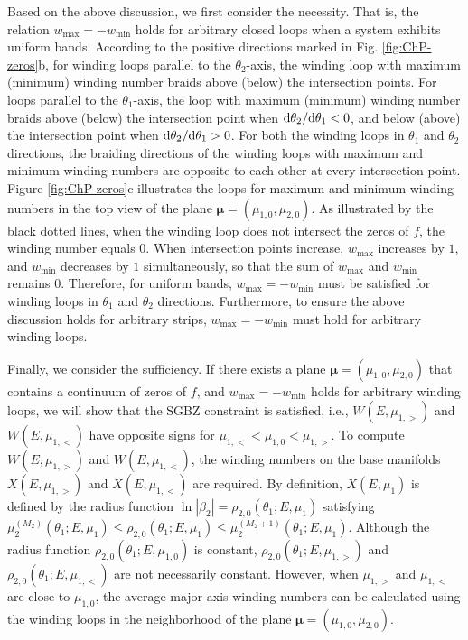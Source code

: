 Based on the above discussion, we first consider the necessity. That
is, the relation $w_{\text{max}}=-w_{\text{min}}$ holds for arbitrary
closed loops when a system exhibits uniform bands. According to the
positive directions marked in Fig. \ref{fig:ChP-zeros}b, for winding
loops parallel to the $\theta_{2}$-axis, the winding loop with maximum
(minimum) winding number braids above (below) the intersection points.
For loops parallel to the $\theta_{1}$-axis, the loop with maximum
(minimum) winding number braids above (below) the intersection point
when $\mathrm{d}\theta_{2}/\mathrm{d}\theta_{1}<0$, and below (above) the intersection
point when $\mathrm{d}\theta_{2}/\mathrm{d}\theta_{1}>0$. For both the winding
loops in $\theta_{1}$ and $\theta_{2}$ directions, the braiding
directions of the winding loops with maximum and minimum winding numbers
are opposite to each other at every intersection point. Figure \ref{fig:ChP-zeros}c
illustrates the loops for maximum and minimum winding numbers in the
top view of the plane $\boldsymbol{\mu}=(\mu_{1,0},\mu_{2,0})$. As
illustrated by the black dotted lines, when the winding loop does
not intersect the zeros of $f$, the winding number equals $0$. When
intersection points increase, $w_{\text{max}}$ increases by $1$,
and $w_{\text{min}}$ decreases by $1$ simultaneously, so that the
sum of $w_{\text{max}}$ and $w_{\text{min}}$ remains $0$. Therefore,
for uniform bands, $w_{\text{max}}=-w_{\text{min}}$ must be satisfied
for winding loops in $\theta_{1}$ and $\theta_{2}$ directions. Furthermore,
to ensure the above discussion holds for arbitrary strips, $w_{\text{max}}=-w_{\text{min}}$
must hold for arbitrary winding loops.

Finally, we consider the sufficiency. If there exists a plane $\boldsymbol{\mu}=(\mu_{1,0},\mu_{2,0})$
that contains a continuum of zeros of $f$, and $w_{\text{max}}=-w_{\text{min}}$
holds for arbitrary winding loops, we will show that the SGBZ constraint
is satisfied, i.e., $W(E,\mu_{1,>})$ and $W(E,\mu_{1,<})$ have opposite
signs for $\mu_{1,<}<\mu_{1,0}<\mu_{1,>}$. To compute $W(E,\mu_{1,>})$
and $W(E,\mu_{1,<})$, the winding numbers on the base manifolds $X(E,\mu_{1,>})$
and $X(E,\mu_{1,<})$ are required. By definition, $X(E,\mu_{1})$
is defined by the radius function $\ln|\beta_{2}|=\rho_{2,0}(\theta_{1};E,\mu_{1})$
satisfying $\mu_{2}^{(M_{2})}(\theta_{1};E,\mu_{1})\leq\rho_{2,0}(\theta_{1};E,\mu_{1})\leq\mu_{2}^{(M_{2}+1)}(\theta_{1};E,\mu_{1})$.
Although the radius function $\rho_{2,0}(\theta_{1};E,\mu_{1,0})$
is constant, $\rho_{2,0}(\theta_{1};E,\mu_{1,>})$ and $\rho_{2,0}(\theta_{1};E,\mu_{1,<})$
are not necessarily constant. However, when $\mu_{1,>}$ and $\mu_{1,<}$
are close to $\mu_{1,0}$, the average major-axis winding numbers can be calculated
using the winding loops in the neighborhood of the plane $\boldsymbol{\mu}=(\mu_{1,0},\mu_{2,0})$.

